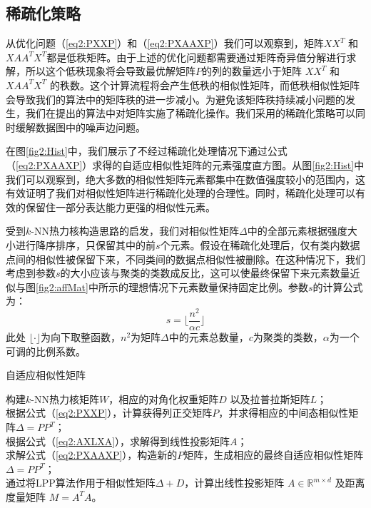 \subsection{稀疏化策略}
\label{sec2:sparse}

从优化问题（\ref{eq2:PXXP}）和（\ref{eq2:PXAAXP}）我们可以观察到，矩阵$XX^T$ 和 $XAA^TX^T$都是低秩矩阵。由于上述的优化问题都需要通过矩阵奇异值分解进行求解，所以这个低秩现象将会导致最优解矩阵$P$的列的数量远小于矩阵 $XX^T$ 和 $XAA^TX^T$ 的秩数。这个计算流程将会产生低秩的相似性矩阵，而低秩相似性矩阵会导致我们的算法中的矩阵秩的进一步减小。为避免该矩阵秩持续减小问题的发生，我们在提出的算法中对矩阵实施了稀疏化操作。我们采用的稀疏化策略可以同时缓解数据图中的噪声边问题。

在图\ref{fig2:Hist}中，我们展示了不经过稀疏化处理情况下通过公式（\ref{eq2:PXAAXP}）求得的自适应相似性矩阵的元素强度直方图。从图\ref{fig2:Hist}中我们可以观察到，绝大多数的相似性矩阵元素都集中在数值强度较小的范围内，这有效证明了我们对相似性矩阵进行稀疏化处理的合理性。同时，稀疏化处理可以有效的保留住一部分表达能力更强的相似性元素。

受到$k$-NN热力核构造思路的启发，我们对相似性矩阵$\Delta$中的全部元素根据强度大小进行降序排序，只保留其中的前$s$个元素。假设在稀疏化处理后，仅有类内数据点间的相似性被保留下来，不同类间的数据点相似性被删除。在这种情况下，我们考虑到参数$s$的大小应该与聚类的类数成反比，这可以使最终保留下来元素数量近似与图\ref{fig2:affMat}中所示的理想情况下元素数量保持固定比例。参数$s$的计算公式为：
\begin{equation}
	s = \lfloor \frac{n^2}{\alpha c}\rfloor
\end{equation}
此处 $\lfloor \cdot\rfloor$为向下取整函数，$n^2$为矩阵$\Delta$中的元素总数量，$c$为聚类的类数，$\alpha$为一个可调的比例系数。

\begin{algorithm}[t]
	\caption{自适应相似性矩阵}
	\label{alg2:AdaAM}
	构建$k$-NN热力核矩阵$W$，相应的对角化权重矩阵$D$ 以及拉普拉斯矩阵$L$；\\
	根据公式（\ref{eq2:PXXP}），计算获得列正交矩阵$P$，并求得相应的中间态相似性矩阵$\Delta = PP^T$；\\
	根据公式（\ref{eq2:AXLXA}），求解得到线性投影矩阵$A$；\\
	求解公式（\ref{eq2:PXAAXP}），构造新的$P$矩阵，生成相应的最终自适应相似性矩阵$\Delta = PP^T$；\\
	通过将LPP算法作用于相似性矩阵$\Delta + D$，计算出线性投影矩阵 $A\in\mathbb{R}^{m\times d}$ 及距离度量矩阵 $M=A^TA$。
\end{algorithm}

